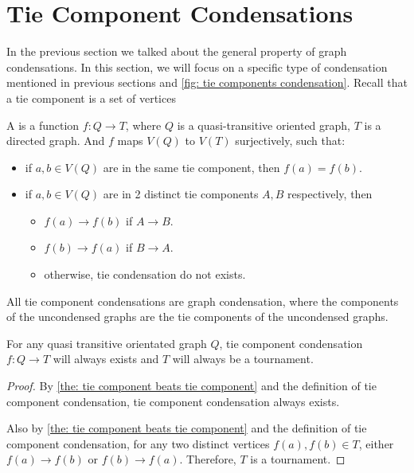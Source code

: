 \section{Tie Component Condensations}

In the previous section we talked about the general property
of graph condensations.
In this section, we will focus on a specific type of condensation
mentioned in previous sections and
\cref{fig: tie components condensation}.
Recall that a tie component is a set of vertices

\begin{definition}
  A  is a
  function \(f: Q \to T\),
  where \(Q\) is a quasi-transitive oriented graph,
  \(T\) is a directed graph.
  And \(f\) maps \(V(Q)\) to \(V(T)\) surjectively,
  such that:
  \begin{itemize}
    \item if \(a, b \in V(Q)\) are in the same tie component,
      then \(f(a) = f(b)\).
    \item if \(a, b \in V(Q)\) are in 2 distinct tie components
      \(A, B\) respectively,
      then
      \begin{itemize}
        \item \(f(a) \to f(b)\) if \(A \to B\).
        \item \(f(b) \to f(a)\) if \(B \to A\).
        \item otherwise, tie condensation do not exists.
      \end{itemize}
  \end{itemize}
\end{definition}

\begin{corollary}\label{the: tie condensation are condensation}
  All tie component condensations are graph condensation,
  where the components of the uncondensed graphs
  are the tie components of the uncondensed graphs.
\end{corollary}

\begin{corollary}\label{the: tie condensation results in tournament}
  For any quasi transitive orientated graph \(Q\),
  tie component condensation \(f: Q \to T\) will always exists
  and \(T\) will always be a tournament.
\end{corollary}
\begin{proof}
  By \cref{the: tie component beats tie component} and
  the definition of tie component condensation,
  tie component condensation always exists.

  Also by \cref{the: tie component beats tie component} and
  the definition of tie component condensation,
  for any two distinct vertices \(f(a), f(b) \in T\),
  either \(f(a) \to f(b)\) or \(f(b) \to f(a)\).
  Therefore, \(T\) is a tournament.
\end{proof}

